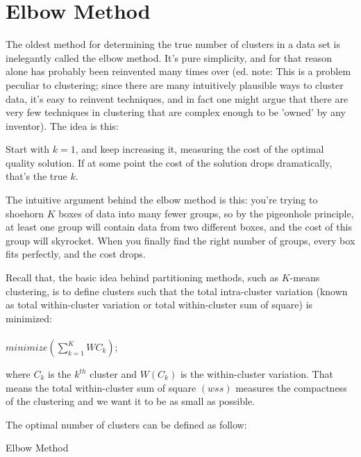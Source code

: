 \section{Elbow Method}
The oldest method for determining the true number of clusters in a data set is inelegantly called the elbow method.
It's pure simplicity, and for that reason alone has probably been reinvented many times over (ed. note:
This is a problem peculiar to clustering; since there are many intuitively plausible ways to cluster data,
it's easy to reinvent techniques, and in fact one might argue that there are very few techniques in clustering
that are complex enough to be 'owned' by any inventor). The idea is this:

    Start with $k=1$, and keep increasing it, measuring the cost of the optimal quality solution.
    If at some point the cost of the solution drops dramatically, that's the true $k$.

The intuitive argument behind the elbow method is this: you're trying to shoehorn $K$ boxes of data into many
fewer groups, so by the pigeonhole principle, at least one group will contain data from two different boxes,
and the cost of this group will skyrocket. When you finally find the right number of groups, every box fits
perfectly, and the cost drops.

Recall that, the basic idea behind partitioning methods, such as $K$-means clustering,
is to define clusters such that the total intra-cluster variation (known as total within-cluster
variation or total within-cluster sum of square) is minimized:\\\\
$minimize(\sum_{k=1}^{K}WC_k)$;

where $C_k$ is the $k^{th}$ cluster and $W(C_k)$ is the within-cluster variation.
That means the total within-cluster sum of square $(wss)$ measures the compactness of the clustering and we want
it to be as small as possible.

The optimal number of clusters can be defined as follow:

\begin{algorithm}
  \caption{Elbow Method}
  \label{alg1}
  \begin{algorithmic}
    
  \end{algorithmic}
\end{algorithm}

